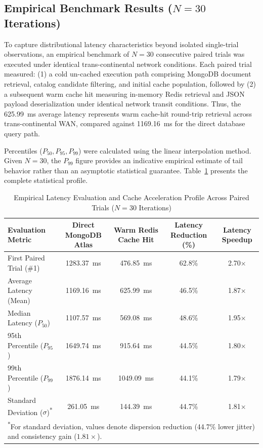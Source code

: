 \documentclass[conference]{IEEEtran}
\begin{document}
\subsection{Empirical Benchmark Results ($N = 30$ Iterations)}
To capture distributional latency characteristics beyond isolated single-trial observations, an empirical benchmark of $N = 30$ consecutive paired trials was executed under identical trans-continental network conditions. Each paired trial measured: (1) a cold un-cached execution path comprising MongoDB document retrieval, catalog candidate filtering, and initial cache population, followed by (2) a subsequent warm cache hit measuring in-memory Redis retrieval and JSON payload deserialization under identical network transit conditions. Thus, the 625.99~ms average latency represents warm cache-hit round-trip retrieval across trans-continental WAN, compared against 1169.16~ms for the direct database query path.

Percentiles ($P_{50}, P_{95}, P_{99}$) were calculated using the linear interpolation method. Given $N = 30$, the $P_{99}$ figure provides an indicative empirical estimate of tail behavior rather than an asymptotic statistical guarantee. Table~\ref{tab:latency_full} presents the complete statistical profile.

\begin{table}[!t]
\caption{Empirical Latency Evaluation and Cache Acceleration Profile Across Paired Trials ($N = 30$ Iterations)}
\label{tab:latency_full}
\centering
\small
\renewcommand{\arraystretch}{1.2}
\setlength{\tabcolsep}{12pt}
\begin{tabular}{lcccc}
\toprule
\textbf{Evaluation Metric} & \textbf{Direct MongoDB Atlas} & \textbf{Warm Redis Cache Hit} & \textbf{Latency Reduction (\%)} & \textbf{Latency Speedup} \\
\midrule
First Paired Trial (\#1) & 1283.37~ms & 476.85~ms & 62.8\% & 2.70$\times$ \\
Average Latency (Mean) & 1169.16~ms & 625.99~ms & 46.5\% & 1.87$\times$ \\
Median Latency ($P_{50}$) & 1107.57~ms & 569.08~ms & 48.6\% & 1.95$\times$ \\
95th Percentile ($P_{95}$) & 1649.74~ms & 915.64~ms & 44.5\% & 1.80$\times$ \\
99th Percentile ($P_{99}$) & 1876.14~ms & 1049.09~ms & 44.1\% & 1.79$\times$ \\
Standard Deviation ($\sigma$)\textsuperscript{*} & 261.05~ms & 144.39~ms & 44.7\% & 1.81$\times$ \\
\midrule
\multicolumn{5}{l}{\scriptsize \textsuperscript{*}For standard deviation, values denote dispersion reduction (44.7\% lower jitter) and consistency gain ($1.81\times$).} \\
\bottomrule
\end{tabular}
\end{table}
\end{document}
